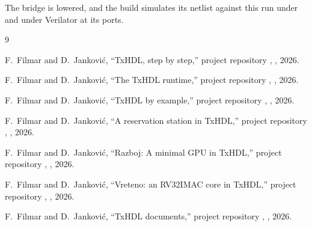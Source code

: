 \documentclass[journal,9pt]{IEEEtran}
\begin{document}




The bridge is lowered, and the build simulates its netlist against
this run under  and under Verilator at its ports.

\begin{thebibliography}{9}

F.~Filmar and D.~Janković, ``TxHDL, step by step,'' project
repository , , 2026.

F.~Filmar and D.~Janković, ``The TxHDL runtime,'' project repository
, , 2026.

F.~Filmar and D.~Janković, ``TxHDL by example,'' project repository
, , 2026.

F.~Filmar and D.~Janković, ``A reservation station in TxHDL,''
project repository , , 2026.

F.~Filmar and D.~Janković, ``Razboj: A minimal GPU in TxHDL,'' project
repository , , 2026.

F.~Filmar and D.~Janković, ``Vreteno: an RV32IMAC core in TxHDL,''
project repository , , 2026.

F.~Filmar and D.~Janković, ``TxHDL documents,'' project repository
, , 2026.

\end{thebibliography}
\end{document}
